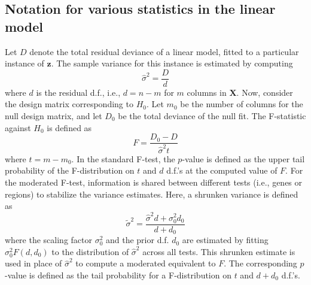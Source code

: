 \documentclass{article}
\newcommand{\nsamples}{n}
\newcommand{\normvar}{\sigma^2}
\newcommand\design{\mathbf{X}}
\newcommand{\nullhypo}[1]{H_{0#1}}
\newcommand\deviance{D}
\newcommand{\normvarhat}{\hat\sigma^2}
\newcommand{\residdf}{d}
\newcommand{\npredictors}{m}
\newcommand{\fstat}{F}
\newcommand\testdf{t}
\newcommand{\priorvar}{\normvar_0}
\newcommand{\normvarshrunk}{\tilde\sigma^2}
\newcommand{\priordf}{\residdf_0}
\newcommand{\logcount}{z}
\newcommand{\oriobs}[0]{\mathbf{\logcount}}
\begin{document}
\subsection{Notation for various statistics in the linear model}
Let $\deviance$ denote the total residual deviance of a linear model, fitted to a particular instance of $\oriobs$. 
The sample variance for this instance is estimated by computing 
\[
\normvarhat = \frac{\deviance}{\residdf}
\]
where $\residdf$ is the residual d.f., i.e., $\residdf=\nsamples-\npredictors$ for $\npredictors$ columns in $\design$.
Now, consider the design matrix corresponding to $\nullhypo{}$.
Let $\npredictors_0$ be the number of columns for the null design matrix, and let $\deviance_0$ be the total deviance of the null fit.
The F-statistic against $\nullhypo{}$ is defined as 
\[
\fstat = \frac{\deviance_0 - \deviance}{\normvarhat\testdf} 
\]
where $\testdf = \npredictors - \npredictors_0$.
In the standard F-test, the $p$-value is defined as the upper tail probability of the F-distribution on $\testdf$ and $\residdf$ d.f.'s at the computed value of $\fstat$.
For the moderated F-test, information is shared between different tests (i.e., genes or regions) to stabilize the variance estimates.
Here, a shrunken variance is defined as 
\[
\normvarshrunk = \frac{\normvarhat\residdf + \priorvar\priordf}{\residdf + \priordf}
\]
where the scaling factor $\priorvar$ and the prior d.f. $\priordf$ are estimated by fitting $\priorvar F( \residdf, \priordf)$ to the distribution of $\normvarhat$ across all tests.
This shrunken estimate is used in place of $\normvarhat$ to compute a moderated equivalent to $\fstat$.
The corresponding $p$-value is defined as the tail probability for a F-distribution on $\testdf$ and $\residdf + \priordf$ d.f.'s.
\end{document}

